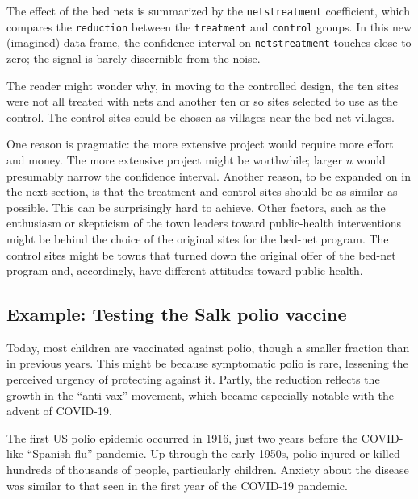 \documentclass[
  letterpaper,
  DIV=11,
  numbers=noendperiod,
  oneside]{scrartcl}
\begin{document}
The effect of the bed nets is summarized by the \texttt{netstreatment}
coefficient, which compares the \texttt{reduction} between the
\texttt{treatment} and \texttt{control} groups. In this new (imagined)
data frame, the confidence interval on \texttt{netstreatment} touches
close to zero; the signal is barely discernible from the noise.

The reader might wonder why, in moving to the controlled design, the ten
sites were not all treated with nets and another ten or so sites
selected to use as the control. The control sites could be chosen as
villages near the bed net villages.

One reason is pragmatic: the more extensive project would require more
effort and money. The more extensive project might be worthwhile; larger
\(n\) would presumably narrow the confidence interval. Another reason,
to be expanded on in the next section, is that the treatment and control
sites should be as similar as possible. This can be surprisingly hard to
achieve. Other factors, such as the enthusiasm or skepticism of the town
leaders toward public-health interventions might be behind the choice of
the original sites for the bed-net program. The control sites might be
towns that turned down the original offer of the bed-net program and,
accordingly, have different attitudes toward public health.

\subsection{Example: Testing the Salk polio
vaccine}\label{example-testing-the-salk-polio-vaccine}

Today, most children are vaccinated against polio, though a smaller
fraction than in previous years. This might be because symptomatic polio
is rare, lessening the perceived urgency of protecting against it.
Partly, the reduction reflects the growth in the ``anti-vax'' movement,
which became especially notable with the advent of COVID-19.

The first US polio epidemic occurred in 1916, just two years before the
COVID-like ``Spanish flu'' pandemic.
{} Up through the
early 1950s, polio injured or killed hundreds of thousands of people,
particularly children. Anxiety about the disease was similar to that
seen in the first year of the COVID-19 pandemic.
\end{document}
